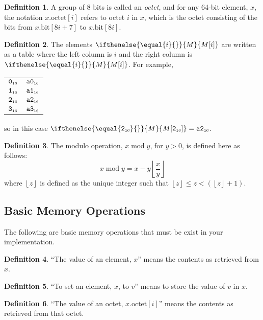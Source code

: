 \documentclass[a4paper,12pt]{article}
\makeatletter
\newcommand{\num}[1]{\texttt{\MakeLowercase{#1}}}
\newcommand{\hex}[1]{\num{#1}_{\textup{\tiny 16}}}
\newcommand{\MEM}[1]{\ifthenelse{\equal{#1}{}}{M}{M[#1]}}
\newcommand{\octno}[2]{#1.\mathrm{octet}[#2]}
\newcommand{\bitno}[2]{#1.\mathrm{bit}[#2]}
\DeclareMathOperator{\MOD}{mod}
\newcommand{\modulo}[2]{#1 \MOD #2}
\theoremstyle{definition}
\newtheorem{definition}{Definition}
\newenvironment{memtable}{%
  \begin{trivlist}
    \item
    }{%
    \end{trivlist}}
\newenvironment{memcolumn}{%
  \begin{tabular}{@{}ll@{}}
    \hline}
    {%
    \hline
  \end{tabular}}
\makeatother
\begin{document}
\begin{definition}
A group of 8 bits is called an \emph{octet}, and for any 64-bit element, $x$, the notation $\octno{x}{i}$ refers to octet $i$ in $x$, which is the octet consisting of the bits from $\bitno{x}{8i+7}$ to $\bitno{x}{8i}$.
\end{definition}

\begin{definition}
The elements $\MEM{i}$ are written as a table where the left column is $i$ and the right column is $\MEM{i}$.  For example,
\begin{memtable}
  \begin{memcolumn}
    $\hex{0}$ & $\hex{A0}$ \\
    $\hex{1}$ & $\hex{A1}$ \\
    $\hex{2}$ & $\hex{A2}$ \\
    $\hex{3}$ & $\hex{A3}$ \\
  \end{memcolumn}
\end{memtable}
so in this case $\MEM{\hex{2}} = \hex{A2}$.
\end{definition}

\begin{definition}
The modulo operation, $\modulo{x}{y}$, for $y>0$, is defined here as follows:
\[ \modulo{x}{y} = x - y \left \lfloor \frac{x}{y} \right \rfloor \]
where $\left \lfloor z \right \rfloor$ is defined as the unique integer such that $\left \lfloor z \right \rfloor \le z < (\left \lfloor z \right \rfloor + 1)$.
\end{definition}

\subsection{Basic Memory Operations}
\label{sec:memory-operations}

The following are basic memory operations that must be exist in your implementation.

\begin{definition}
``The value of an element, $x$'' means the contents as retrieved from $x$.
\end{definition}

\begin{definition}
``To set an element, $x$, to $v$'' means to store the value of $v$ in $x$.
\end{definition}

\begin{definition}
``The value of an octet, $\octno{x}{i}$'' means the contents as retrieved from that octet.
\end{definition}
\end{document}
